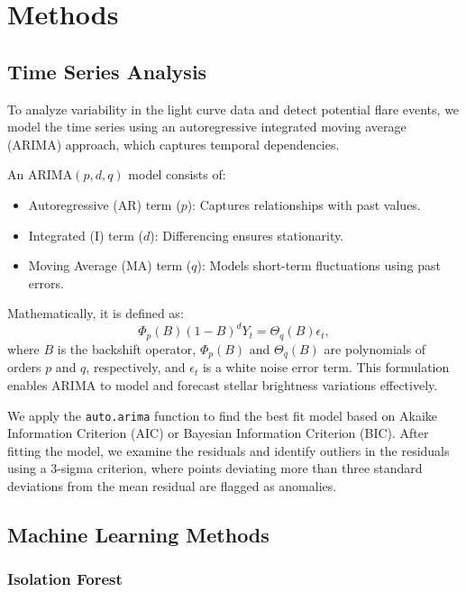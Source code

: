 \documentclass[
]{article}
\begin{document}
\section{Methods}\label{methods}

\subsection{Time Series Analysis}\label{time-series-analysis}

To analyze variability in the light curve data and detect potential flare events, we model the time series using an autoregressive integrated moving average (ARIMA) approach, which captures temporal dependencies.

An ARIMA\((p,d,q)\) model consists of:

\begin{itemize}
    \item Autoregressive (AR) term ($p$): Captures relationships with past values.
    \item Integrated (I) term ($d$): Differencing ensures stationarity.
    \item Moving Average (MA) term ($q$): Models short-term fluctuations using past errors.
\end{itemize}

Mathematically, it is defined as:
\begin{equation}
    \Phi_p(B)(1 - B)^d Y_t = \Theta_q(B) \epsilon_t,
\end{equation}
where \(B\) is the backshift operator, \(\Phi_p(B)\) and \(\Theta_q(B)\) are polynomials of orders \(p\) and \(q\), respectively, and \(\epsilon_t\) is a white noise error term. This formulation enables ARIMA to model and forecast stellar brightness variations effectively.

We apply the \texttt{auto.arima} function to find the best fit model based on Akaike Information Criterion (AIC) or Bayesian Information Criterion (BIC). After fitting the model, we examine the residuals and identify outliers in the residuals using a 3-sigma criterion, where points deviating more than three standard deviations from the mean residual are flagged as anomalies.

\subsection{Machine Learning Methods}\label{machine-learning-methods}

\subsubsection{Isolation Forest}\label{isolation-forest}
\end{document}
